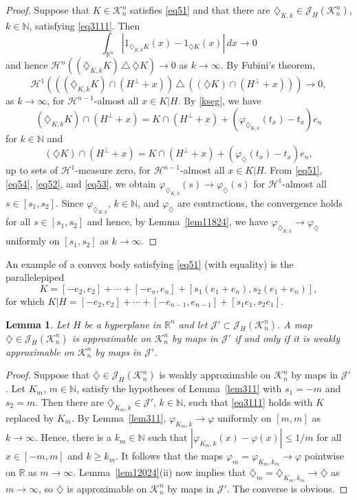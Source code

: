 \documentclass[12pt,reqno]{amsart}
\newcommand{\N}{{\mathbb N}}
\newcommand{\R}{{\mathbb R}}
\newcommand{\cH}{{\mathcal H}}
\newcommand{\cK}{\mathcal K}
\newcommand{\cJ}{\mathcal J}
\newtheorem{lem}[thm]{Lemma}
\newcommand{\di}{\diamondsuit}
\numberwithin{equation}{section}
\begin{document}
\begin{proof}
Suppose that $K\in\cK^n_n$ satisfies \eqref{eq51} and that there are $\di_{K,k}\in \cJ_H(\cK_n^n)$, $k\in \N$, satisfying \eqref{eq3111}. Then
$$\int_{\R^n}|1_{\di_{K,k}K}(x)-1_{\di K}(x)|\,dx\to 0$$
and hence $\cH^n\left((\di_{K,k}K)\,\triangle\, \di K\right)\to 0$ as $k\to\infty$.  By Fubini's theorem,
\begin{equation}\label{eq54}
\cH^1\left(((\di_{K,k}K)\cap(H^{\perp}+x))\,\triangle\,((\di K)
\cap(H^{\perp}+x))\right)\to 0,
\end{equation}
as $k\to\infty$, for $\cH^{n-1}$-almost all $x\in K|H$. By \eqref{kseg}, we have
\begin{equation}\label{eq52}
(\di_{K,k}K)\cap(H^{\perp}+x)=K\cap(H^{\perp}+x)+(\varphi_{\di_{K,k}}(t_x)
-t_x)e_n
\end{equation}
for $k\in \N$ and
\begin{equation}\label{eq53}
(\di K)\cap(H^{\perp}+x)=K\cap(H^{\perp}+x)+(\varphi_{\di}(t_x)
-t_x)e_n,
\end{equation}
up to sets of $\cH^1$-measure zero, for $\cH^{n-1}$-almost all $x\in K|H$. From \eqref{eq51}, \eqref{eq54}, \eqref{eq52}, and \eqref{eq53}, we obtain $\varphi_{\di_{K,k}}(s)\to \varphi_{\di}(s)$ for $\cH^{1}$-almost all $s\in [s_1,s_2]$. Since $\varphi_{\di_{K,k}}$, $k\in \N$, and $\varphi_{\di}$ are contractions, the convergence holds for all $s\in [s_1,s_2]$ and hence, by Lemma~\ref{lem11824}, we have
$\varphi_{\di_{K,k}}\to \varphi_{\di}$ uniformly on $[s_1,s_2]$ as $k\to \infty$.
\end{proof}

An example of a convex body satisfying \eqref{eq51} (with equality) is the parallelepiped
$$K=[-e_2,e_2]+\cdots +[-e_n,e_n]+[s_1(e_1+e_n), s_2(e_1+e_n)],$$
for which $K|H=[-e_2,e_2]+\cdots +[-e_{n-1},e_{n-1}]+[s_1e_1, s_2e_1]$.

\begin{lem}\label{lem1}
Let $H$ be a hyperplane in $\R^n$ and let $\cJ'\subset \cJ_H(\cK_n^n)$.  A map $\di\in \cJ_H(\cK_n^n)$ is approximable on ${\cK}^n_n$ by maps in $\cJ'$ if and only if it is weakly approximable on ${\cK}^n_n$ by maps in $\cJ'$.
\end{lem}

\begin{proof}
Suppose that $\di\in \cJ_H(\cK_n^n)$ is weakly approximable on ${\cK}^n_n$ by maps in $\cJ'$. Let $K_m$, $m\in \N$, satisfy the hypotheses of Lemma~\ref{lem311} with $s_1=-m$ and $s_2=m$. Then there are $\di_{K_m,k}\in \cJ'$, $k\in \N$, such that \eqref{eq3111} holds with $K$ replaced by $K_m$.  By Lemma~\ref{lem311}, $\varphi_{K_m,k}\to \varphi$ uniformly on $[m,m]$ as $k\to\infty$. Hence, there is a $k_m\in\N$ such that $|\varphi_{K_m,k}(x)- \varphi(x)|\le 1/m$ for all $x\in [-m,m]$ and  $k\ge k_m$.  It follows that the maps $\varphi_m=\varphi_{K_m,k_m}\to\varphi$ pointwise on $\R$ as $m\to\infty$. Lemma~\ref{lem12024}(ii) now implies that $\di_m=\di_{K_m,k_m}\to \di$ as $m\to\infty$, so $\di$ is approximable on ${\cK}^n_n$ by maps in $\cJ'$.  The converse is obvious.
\end{proof}
\end{document}
